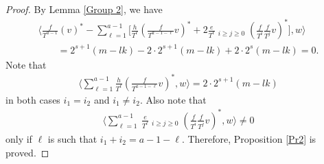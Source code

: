 \documentclass[pdftex]{sigma}
\numberwithin{equation}{section}
\begin{document}
\begin{proof}
By Lemma \ref{Group 2}, we have
\begin{gather*}
\bigg\langle \frac{f}{T^{a-1}} (v)^*-
\sum_{\ell=1}^{a-1}\bigg[\frac{h}{T^{\ell}}\left(
\frac{f}{T^{a-1-\ell}}v\right)^* + 2\frac{e}{T^{\ell}} \mathop{\sum_{i+j=a-1-\ell}}_{i\geq j\geq 0} \left(\frac{f}{T^i}\frac{f}{T^j}v\right)^*\bigg], w \bigg\rangle \\
\qquad{} = 2^{s+1} (m-lk) - 2 \cdot 2^{s+1} (m-lk) + 2 \cdot 2^{s} (m-lk) = 0.
\end{gather*}
Note that
\begin{gather*}
 \bigg\langle \sum_{\ell=1}^{a-1} \frac{h}{T^{\ell}}\left(\frac{f}{T^{a-1-\ell}}v\right)^*, w \bigg\rangle = 2 \cdot 2^{s+1} (m - lk)
\end{gather*}
in both cases $i_1 = i_2$ and $i_1 \ne i_2$. Also note that
\begin{gather*}
\bigg\langle \sum_{\ell=1}^{a-1}\ \frac{e}{T^{\ell}} \mathop{\sum_{i+j=a-1-\ell}}_{i\geq j\geq 0} \left(\frac{f}{T^i}\frac{f}{T^j}v\right)^*, w \bigg\rangle \ne 0
\end{gather*}
only if $\ell$ is such that $i_1+i_2 = a-1-\ell$. Therefore, Proposition \ref{Pr2} is proved.
\end{proof}
\end{document}
